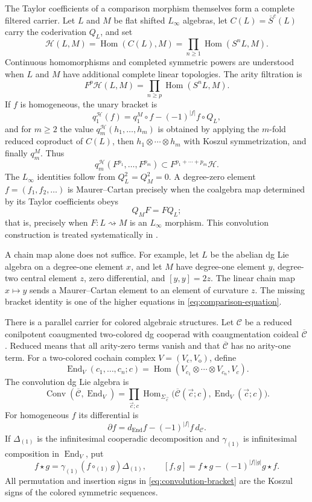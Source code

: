 \documentclass[11pt]{article}
\theoremstyle{definition}
\theoremstyle{remark}
\newcommand{\End}{\operatorname{End}}
\newcommand{\Conv}{\operatorname{Conv}}
\begin{document}
The Taylor coefficients of a comparison morphism themselves form a complete
filtered carrier.  Let $L$ and $M$ be flat shifted $L_\infty$ algebras, let
$C(L)=\overline S^c(L)$ carry the coderivation $Q_L$, and set
\[
 \mathcal H(L,M)
 =\operatorname{Hom}(C(L),M)
 =\prod_{n\geq1}\operatorname{Hom}(S^nL,M).
 \tag{5.1}\label{eq:comparison-carrier}
\]
Continuous homomorphisms and completed symmetric powers are understood when
$L$ and $M$ have additional complete linear topologies.  The arity filtration
is
\[
 F^p\mathcal H(L,M)
 =\prod_{n\geq p}\operatorname{Hom}(S^nL,M).
 \tag{5.2}\label{eq:comparison-filtration}
\]
If $f$ is homogeneous, the unary bracket is
\[
 q_1^{\mathcal H}(f)=q_1^M\circ f-(-1)^{|f|}f\circ Q_L,
 \tag{5.3}\label{eq:comparison-differential}
\]
and for $m\geq2$ the value
$q_m^{\mathcal H}(h_1,\ldots,h_m)$ is obtained by applying the $m$-fold
reduced coproduct of $C(L)$, then $h_1\otimes\cdots\otimes h_m$ with
Koszul symmetrization, and finally $q_m^M$.  Thus
\[
 q_m^{\mathcal H}(F^{p_1},\ldots,F^{p_m})
 \subset F^{p_1+\cdots+p_m}\mathcal H.
 \tag{5.4}\label{eq:comparison-additivity}
\]
The $L_\infty$ identities follow from $Q_L^2=Q_M^2=0$.  A degree-zero
element $f=(f_1,f_2,\ldots)$ is Maurer--Cartan precisely when the coalgebra
map determined by its Taylor coefficients obeys
\[
 Q_MF=FQ_L;
 \tag{5.5}\label{eq:comparison-equation}
\]
that is, precisely when $F:L\rightsquigarrow M$ is an $L_\infty$ morphism.
This convolution construction is treated systematically in
\cite{RobertNicoudWierstra}.

A chain map alone does not suffice.  For example, let $L$ be the abelian dg
Lie algebra on a degree-one element $x$, and let $M$ have degree-one element
$y$, degree-two central element $z$, zero differential, and
$[y,y]=2z$.  The linear chain map $x\mapsto y$ sends a Maurer--Cartan element
to an element of curvature $z$.  The missing bracket identity is one of the
higher equations in \eqref{eq:comparison-equation}.

There is a parallel carrier for colored algebraic structures.  Let
$\mathcal C$ be a reduced conilpotent coaugmented two-colored dg cooperad with
coaugmentation coideal $\overline{\mathcal C}$.  Reduced means that all
arity-zero terms vanish and that $\overline{\mathcal C}$ has no arity-one
term.  For a two-colored cochain complex $V=(V_\mathrm c,V_\mathrm o)$, define
\[
 \End_V(c_1,\ldots,c_n;c)
 =\operatorname{Hom}
 (V_{c_1}\otimes\cdots\otimes V_{c_n},V_c).
\]
The convolution dg Lie algebra is
\[
 \Conv(\overline{\mathcal C},\End_V)
 =\prod_{\vec c;c}
 \operatorname{Hom}_{\Sigma_{\vec c}}
 \bigl(\overline{\mathcal C}(\vec c;c),
       \End_V(\vec c;c)\bigr).
 \tag{5.6}\label{eq:colored-convolution}
\]
For homogeneous $f$ its differential is
\[
 \partial f=d_{\End}f-(-1)^{|f|}f\,d_{\mathcal C}.
 \tag{5.7}\label{eq:convolution-differential}
\]
If $\Delta_{(1)}$ is the infinitesimal cooperadic decomposition and
$\gamma_{(1)}$ is infinitesimal composition in $\End_V$, put
\[
 f\star g=\gamma_{(1)}(f\circ_{(1)}g)\Delta_{(1)},
 \qquad
 [f,g]=f\star g-(-1)^{|f||g|}g\star f.
 \tag{5.8}\label{eq:convolution-bracket}
\]
All permutation and insertion signs in \eqref{eq:convolution-bracket} are
the Koszul signs of the colored symmetric sequences.
\end{document}
